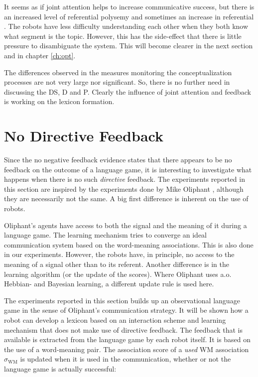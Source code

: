 It seems as if joint attention helps to increase communicative success, but there is an increased level of referential polysemy and sometimes an increase in referential . The robots have less difficulty understanding each other when they both know what segment is the topic. However, this has the side-effect that there is little pressure to disambiguate the system. This will become clearer in the next section and in chapter \ref{ch:opt}.

\p
The differences observed in the measures monitoring the conceptualization processes are not very large nor significant. So, there is no further need in discussing the DS, D and P. Clearly the influence of joint attention and feedback is working on the lexicon formation.

\section{No Directive Feedback}\label{s:feed:oli}

Since the no negative feedback evidence states that there appears to be no feedback on the outcome of a language game, it is interesting to investigate what happens when there is no such {\em directive} feedback. The experiments reported in this section are inspired by the experiments done by Mike Oliphant \cite{oliphant:1997,oliphant:1998,oliphant:2000}, although they are necessarily not the same. A big first difference is inherent on the use of robots. 

Oliphant's agents have access to both the signal and the meaning of it during a language game. The learning mechanism tries to converge an ideal communication system based on the word-meaning associations. This is also done in our experiments. However, the robots have, in principle, no access to the meaning of a signal other than to its referent. Another difference is in the learning algorithm (or the update of the scores). Where Oliphant uses a.o. Hebbian- and Bayesian learning, a different update rule is used here.

The experiments reported in this section builds up an observational language game in the sense of Oliphant's communication strategy. It will be shown how a robot can develop a lexicon based on an interaction scheme and learning mechanism that does not make use of directive feedback. The feedback that is available is extracted from the language game by each robot itself. It is based on the use of a word-meaning pair. The association score of a {\em used} WM association $\sigma_{\mbox{WM}}$ is updated when it is used in the communication, whether or not the language game is actually successful:

